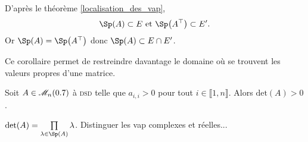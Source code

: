 \begin{preuve}
    D'après le théorème \ref{localisation_des_vap}, 
    $$\Sp(A) \subset E \text{ et } \Sp \big( \Trsp{A} \big) \subset E'.$$
    Or $\Sp(A) = \Sp \big( \Trsp{A} \big)$ donc $\Sp(A) \subset E \cap E'$.
\end{preuve}    

Ce corollaire permet de restreindre davantage le domaine où se trouvent les valeurs propres d'une matrice. 

\begin{prop}{}
    Soit $A \in \mathscr{M}_n(0.7)$ à \textsc{dsd} telle que $a_{i,i} > 0$ pour tout $i \in \llbracket 1, n \rrbracket$. Alors $\mathrm{det}(A) > 0$. 
\end{prop}

\begin{preuve}
        $\det(A) = \prod\limits_{\lambda \in \Sp(A)} \lambda$. Distinguer les vap complexes et réelles...
\end{preuve}

